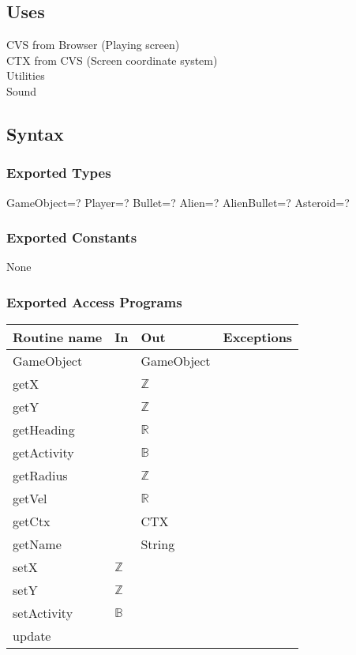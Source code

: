 \documentclass[12pt]{article}
\begin{document}
\subsection*{Uses}

CVS from Browser (Playing screen)\\
CTX from CVS (Screen coordinate system)\\
Utilities\\
Sound\\

\subsection*{Syntax}

\subsubsection*{Exported Types}

GameObject=?
Player=?
Bullet=?
Alien=?
AlienBullet=?
Asteroid=?

\subsubsection*{Exported Constants}

None

\subsubsection*{Exported Access Programs}

\begin{tabular}{| l | l | l | l |}
    \hline
    \textbf{Routine name} & \textbf{In} & \textbf{Out} & \textbf{Exceptions}\\
    \hline
    GameObject & ~ & GameObject & ~\\
    \hline
    getX & ~ & $\mathbb{Z}$ & ~\\
    \hline
    getY & ~ & $\mathbb{Z}$ & ~\\
    \hline
    getHeading & ~ & $\mathbb{R}$ & ~\\
    \hline
    getActivity & ~ & $\mathbb{B}$ & ~\\
    \hline
    getRadius & ~ & $\mathbb{Z}$ & ~\\
    \hline
    getVel & ~ & $\mathbb{R}$ & ~\\
    \hline
    getCtx & ~ & CTX & ~\\
    \hline
    getName & ~ & String & ~\\
    \hline
    setX & $\mathbb{Z}$ & ~ & ~\\
    \hline
    setY & $\mathbb{Z}$ & ~ & ~\\
    \hline
    setActivity & $\mathbb{B}$ & ~ & ~\\
    \hline
    update & ~ & ~ & ~\\
    \hline
\end{tabular}
\end{document}
